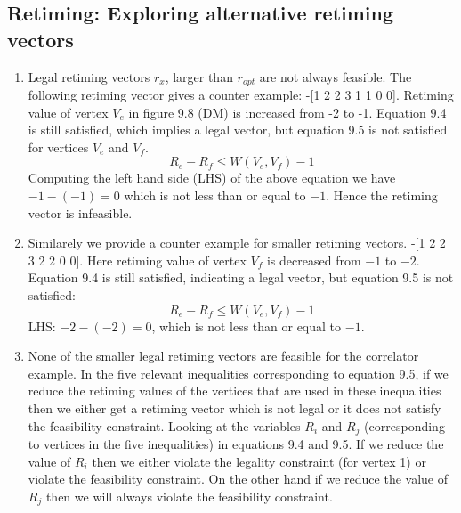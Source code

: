 \documentclass{acm_proc_article-sp}
\begin{document}
\subsection{Retiming: Exploring alternative retiming vectors}

\begin{enumerate}
  \item Legal retiming vectors $r_{x}$, larger than $r_{opt}$ are not always
    feasible.
    The following retiming vector gives a counter example:
    -[1 2 2 3 1 1 0 0]. Retiming value of vertex $V_{e}$ in figure 9.8 (DM)
    is increased from -2 to -1. Equation 9.4 is still satisfied, which implies
    a legal vector, but equation 9.5 is not satisfied for vertices $V_{e}$ and $V_{f}$.
    \begin{equation}
      R_{e} - R_{f} \leq W(V_{e}, V_{f}) - 1
    \end{equation}
    Computing the left hand side (LHS) of the above equation we have
    $-1 - (-1) = 0$ which is not less than or equal to $-1$. Hence the
    retiming vector is infeasible.

  \item Similarely we provide a counter example for smaller retiming vectors.
    -[1 2 2 3 2 2 0 0]. Here retiming value of vertex $V_{f}$ is decreased
    from $-1$ to $-2$. Equation 9.4 is still satisfied, indicating a legal
    vector, but equation 9.5 is not satisfied:
    \begin{equation}
      R_{e} - R_{f} \leq W(V_{e}, V_{f}) - 1
    \end{equation}
    LHS: $-2 - (-2) = 0$, which is not less than or equal to $-1$.

  \item None of the smaller legal retiming vectors are feasible for the correlator
    example. In the five relevant inequalities corresponding to equation 9.5,
    if we reduce the retiming values of the vertices that are used in these
    inequalities then we either get a retiming vector which is not legal or
    it does not satisfy the feasibility constraint.
    Looking at the variables $R_{i}$ and $R_{j}$ (corresponding to vertices in the
    five inequalities) in equations 9.4 and 9.5. If we reduce the value of $R_{i}$
    then we either violate the legality constraint (for vertex 1) or violate the
    feasibility constraint. On the other hand if we reduce the value of $R_{j}$ then
    we will always violate the feasibility constraint.
\end{enumerate}
\end{document}
